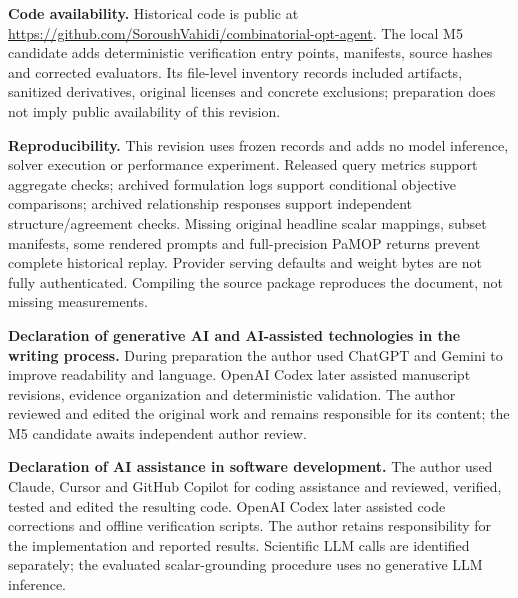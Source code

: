 \documentclass[pdflatex,sn-basic,Numbered]{sn-jnl}
\begin{document}
\noindent\textbf{Code availability.} Historical code is public at \url{https://github.com/SoroushVahidi/combinatorial-opt-agent}. The local M5 candidate adds deterministic verification entry points, manifests, source hashes and corrected evaluators. Its file-level inventory records included artifacts, sanitized derivatives, original licenses and concrete exclusions; preparation does not imply public availability of this revision.

\noindent\textbf{Reproducibility.} This revision uses frozen records and adds no model inference, solver execution or performance experiment. Released query metrics support aggregate checks; archived formulation logs support conditional objective comparisons; archived relationship responses support independent structure/agreement checks. Missing original headline scalar mappings, subset manifests, some rendered prompts and full-precision PaMOP returns prevent complete historical replay. Provider serving defaults and weight bytes are not fully authenticated. Compiling the source package reproduces the document, not missing measurements.

\noindent\textbf{Declaration of generative AI and AI-assisted technologies in the writing process.} During preparation the author used ChatGPT and Gemini to improve readability and language. OpenAI Codex later assisted manuscript revisions, evidence organization and deterministic validation. The author reviewed and edited the original work and remains responsible for its content; the M5 candidate awaits independent author review.

\noindent\textbf{Declaration of AI assistance in software development.} The author used Claude, Cursor and GitHub Copilot for coding assistance and reviewed, verified, tested and edited the resulting code. OpenAI Codex later assisted code corrections and offline verification scripts. The author retains responsibility for the implementation and reported results. Scientific LLM calls are identified separately; the evaluated scalar-grounding procedure uses no generative LLM inference.


\end{document}
